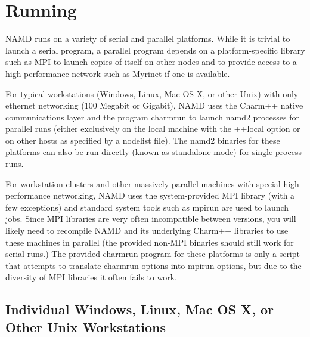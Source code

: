 
\section{Running \NAMD}
\label{section:run}

NAMD runs on a variety of serial and parallel platforms.  While it is
trivial to launch a serial program, a parallel program depends on a
platform-specific library such as MPI to launch copies of itself on
other nodes and to provide access to a high performance network such
as Myrinet if one is available.

For typical workstations (Windows, Linux, Mac OS X, or other Unix)
with only ethernet networking (100 Megabit or Gigabit), NAMD uses the
Charm++ native communications layer and the program charmrun to launch
namd2 processes for parallel runs (either exclusively on the local
machine with the ++local option or on other hosts as specified by a
nodelist file).  The namd2 binaries for these platforms can also be
run directly (known as standalone mode) for single process runs.

For workstation clusters and other massively parallel machines with
special high-performance networking, NAMD uses the system-provided
MPI library (with a few exceptions) and standard system tools such as
mpirun are used to launch jobs.  Since MPI libraries are very often
incompatible between versions, you will likely need to recompile NAMD
and its underlying Charm++ libraries to use these machines in parallel
(the provided non-MPI binaries should still work for serial runs.)
The provided charmrun program for these platforms is only a script
that attempts to translate charmrun options into mpirun options, but
due to the diversity of MPI libraries it often fails to work.

\subsection{Individual Windows, Linux, Mac OS X, or Other Unix Workstations}

